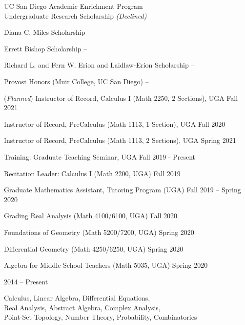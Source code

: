 \documentclass[letterpaper,MMMyyyy,nonstopmode]{simpleresumecv}
\begin{document}
\begin{Body}
\BulletItem
UC San Diego Academic Enrichment Program \\
Undergraduate Research Scholarship \textit{(Declined)}
\hfill{}

\BulletItem
Diana C. Miles Scholarship
\hfill{} -- 

\BulletItem
Errett Bishop Scholarship
\hfill{} -- 

\BulletItem
Richard L. and Fern W. Erion and Laidlaw-Erion Scholarship
\hfill{} -- 

\BulletItem
Provost Honors (Muir College, UC San Diego)
\hfill{} -- 

\Gap


\Gap

\BulletItem (\textit{Planned}) Instructor of Record, Calculus I (Math 2250, $2$ Sections), UGA 
\hfill Fall 2021

\BulletItem Instructor of Record, PreCalculus (Math 1113, $1$ Section), UGA
\hfill Fall 2020


\BulletItem Instructor of Record, PreCalculus (Math 1113, $2$ Sections), UGA
\hfill Spring 2021

\BulletItem Training: Graduate Teaching Seminar, UGA
\hfill Fall 2019 - Present

\Gap

\BulletItem Recitation Leader: Calculus I (Math 2200, UGA)
\hfill Fall 2019 

\BulletItem Graduate Mathematics Assistant, Tutoring Program (UGA) 
\hfill Fall 2019 -- Spring 2020

\BulletItem Grading 
\SubBulletItem Real Analysis (Math 4100/6100, UGA)
\hfill Fall 2020 

\SubBulletItem Foundations of Geometry (Math 5200/7200, UGA)
\hfill Spring 2020

\SubBulletItem Differential Geometry (Math 4250/6250, UGA)
\hfill Spring 2020

\SubBulletItem Algebra for Middle School Teachers (Math 5035, UGA) 
\hfill Spring 2020



\hfill
2014 -- Present
\Gap

\begin{Detail}
\SubBulletItem Calculus, Linear Algebra, Differential Equations, \\
Real Analysis, Abstract Algebra, Complex Analysis, \\
Point-Set Topology, Number Theory, Probability, Combinatorics
\end{Detail}


\end{Body}
\end{document}
